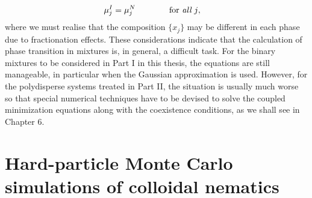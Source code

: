 {\begin{align}
\mu^{I}_{j}&=\mu^{N}_{j} \qquad\qquad \text{for {\em all} $j$},
\end{align}
where we must realise that the composition $\{x_{j}\}$ may be different in each
phase due to fractionation effects.
These considerations indicate that the calculation of phase transition in mixtures is,
in general, a difficult task. For the binary mixtures to be considered
in Part I in this thesis, the equations are still manageable, in particular when
the Gaussian approximation is used.
However, for the polydisperse systems treated in Part II,  the situation is usually much worse so that
special numerical techniques have to be devised to solve
the coupled minimization equations along with the coexistence conditions,
as we shall see in Chapter 6.
}

\section[HPMC simulations of colloidal nematics]{Hard-particle Monte Carlo simulations of colloidal nematics}

\clearpage